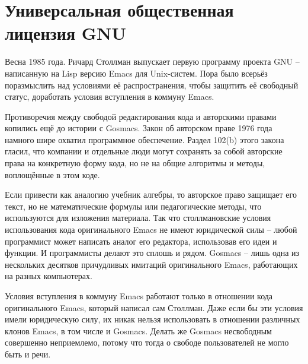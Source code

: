 

\chapter{Универсальная общественная лицензия GNU}

Весна 1985 года. Ричард Столлман выпускает первую программу проекта GNU -- написанную на Lisp версию Emacs для Unix-систем. Пора было всерьёз поразмыслить над условиями её распространения, чтобы защитить её свободный статус, доработать условия вступления в коммуну Emacs.

Противоречия между свободой редактирования кода и авторскими правами копились ещё до истории с Gosmacs. Закон об авторском праве 1976 года намного шире охватил программное обеспечение. Раздел 102(b) этого закона гласил, что компании и отдельные люди могут сохранять за собой авторские права на конкретную форму кода, но не на общие алгоритмы и методы, воплощённые в этом коде. 

Если привести как аналогию учебник алгебры, то авторское право защищает его текст, но не математические формулы или педагогические методы, что используются для изложения материала. Так что столлмановские условия использования кода оригинального Emacs не имеют юридической силы -- любой программист может написать аналог его редактора, использовав его идеи и функции. И программисты делают это сплошь и рядом. Gosmacs -- лишь одна из нескольких десятков причудливых имитаций оригинального Emacs, работающих на разных компьютерах.

Условия вступления в коммуну Emacs работают только в отношении кода оригинального Emacs, который написал сам Столлман. Даже если бы эти условия имели юридическую силу, их никак нельзя использовать в отношении различных клонов Emacs, в том числе и Gosmacs. Делать же Gosmacs несвободным совершенно неприемлемо, потому что тогда о свободе пользователей не могло быть и речи.

